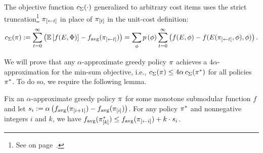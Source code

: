 \noindent
The objective function $c_{\Sigma}\! \left( {\cdot} \right) $ generalized to
arbitrary cost items uses the strict truncation\footnote{See
   on page~\pageref{def:strict-prune}.}
$ \pi_{[\gets{t}] }$ in place of $ \pi_{[{t}]} $ in the unit-cost definition:
\begin{equation}
  \label{eqn:min-sum-obj-with-costs}
  c_{\Sigma}\! \left( {\pi} \right)  := \sum_{t =  0}^{\infty}  \left( {\mathbb{E}\left[f(E, {\color{black}{\ensuremath{\Phi}}})\right] -
      f_{\text{avg}}( \pi_{[\gets{t}] })} \right)  = \sum_{{\color{black}{\ensuremath{\phi}}}} {\color{black}{\ensuremath{p \left( {{\color{black}{\ensuremath{\phi}}}} \right) }}} \sum_{t =
    0}^{\infty}  \left( {f(E, {\color{black}{\ensuremath{\phi}}}) - f(E( \pi_{[\gets{t}] },
  {\color{black}{\ensuremath{\phi}}}), {\color{black}{\ensuremath{\phi}}})} \right) .
\end{equation}

\noindent
We will prove that any $\alpha$-approximate greedy policy $\pi$
achieves a $4 \alpha$-approximation for the min-sum objective, i.e., 
$c_{\Sigma}\! \left( {\pi} \right)  \le 4 \alpha \, c_{\Sigma}\! \left( {\pi^*} \right) $ for all policies
$\pi^*$.  
To do so, we require the following lemma.

%
%
%
%
%
%
%
%
%
%
%
%
%






\begin {lemma} \label{lem:greedy_rate}
Fix an $\alpha$-approximate greedy policy $\pi$ for some \term monotone submodular function $f$
and let $s_i :=\alpha  \left( {f_{\text{avg}}( \pi_{[{i+1}]} ) -  f_{\text{avg}}( \pi_{[{i}]} )} \right) $.
%
%
%
%
For any policy $\pi^*$ and nonnegative integers $i$ and $k$, we have $f_{\text{avg}}( \pi^*_{[{k}]} ) \le  f_{\text{avg}}( \pi_{[\gets{i}] }) + k \cdot s_i $.
\end {lemma}
%
%
%
%


